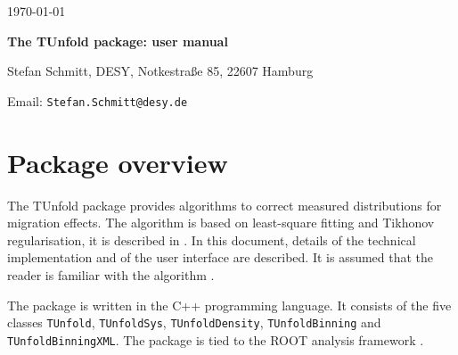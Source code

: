 \documentclass[12pt]{article}
\newcommand{\tunfoldmajor}{17}
\newcommand{\tunfoldminor}{7}
\newcommand{\tunfoldversion}{{\tunfoldmajor{}.\tunfoldminor}}
\begin{document}
\begin{titlepage}
\noindent
\begin{flushleft}
\end{flushleft}
\noindent
       \today      \\

\vspace{2cm}
\begin{center}
\begin{Large}
{\bf The TUnfold package: user manual}
\vspace{2cm}

Stefan Schmitt, DESY, Notkestra\ss{}e 85, 22607 Hamburg

\vspace{0.5cm}
 Email: {\tt Stefan.Schmitt@desy.de}
\end{Large}
\end{center}

\vspace{2cm}

\begin{abstract}

{\em\noindent
TUnfold is a package with provides functionality for correcting
migration and background effects for multi-dimensional distributions.
This document gives a user-oriented technical description of the
package, valid for the version number \tunfoldversion.
}
\end{abstract}

\vspace{1.5cm}

\end{titlepage}

\section{Package overview}

The TUnfold package provides algorithms to correct
measured distributions for migration effects. The algorithm is based
on least-square fitting and Tikhonov regularisation, it is described
in \cite{Schmitt:2012kp}. In this document, details of the technical
implementation and of the user interface are described. It is assumed
that the reader is familiar with the algorithm \cite{Schmitt:2012kp}.

The package is written in the C++ programming language. It consists of
the five classes {\tt TUnfold}, {\tt TUnfoldSys}, {\tt TUnfoldDensity},
{\tt TUnfoldBinning} and {\tt TUnfoldBinningXML}. 
The package is tied to the ROOT analysis
framework \cite{Brun:1997pa}. 
\end{document}
